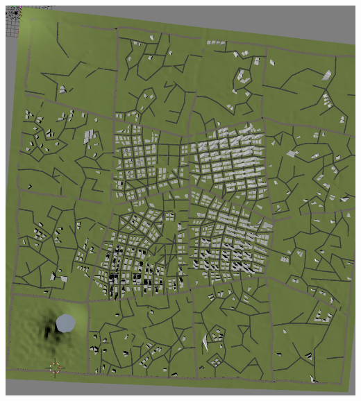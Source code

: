 \documentclass[a4paper,12pt]{scrartcl}
\begin{document}
\center
\includegraphics[width=\textwidth]{view3.png}




\nocite{*}

\end{document}
